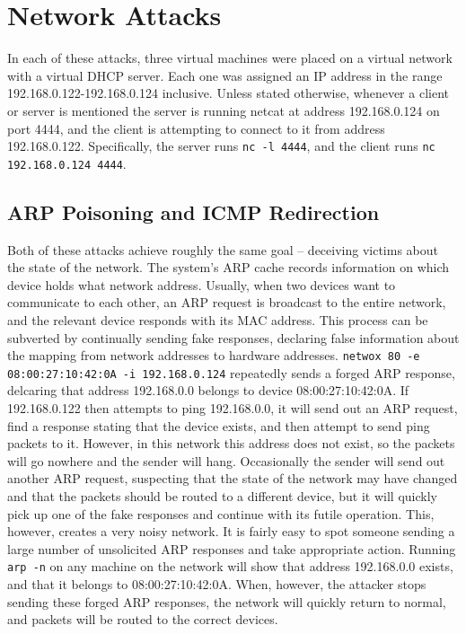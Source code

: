 \section{Network Attacks}

In each of these attacks, three virtual machines were placed on a virtual network with a virtual DHCP server. Each one
was assigned an IP address in the range 192.168.0.122-192.168.0.124 inclusive. Unless stated otherwise, whenever a
client or server is mentioned the server is running netcat at address 192.168.0.124 on port 4444, and the client is
attempting to connect to it from address 192.168.0.122. Specifically, the server runs {\tt nc -l 4444}, and the
client runs {\tt nc 192.168.0.124 4444}.

\subsection{ARP Poisoning and ICMP Redirection}

Both of these attacks achieve roughly the same goal -- deceiving victims about the state of the network. The system's
ARP cache records information on which device holds what network address. Usually, when two devices want to communicate
to each other, an ARP request is broadcast to the entire network, and the relevant device responds with its MAC address.
This process can be subverted by continually sending fake responses, declaring false information about the mapping from
network addresses to hardware addresses. {\tt netwox 80 -e 08:00:27:10:42:0A -i 192.168.0.124} repeatedly sends a forged
ARP response, delcaring that address 192.168.0.0 belongs to device 08:00:27:10:42:0A. If 192.168.0.122 then attempts to
ping 192.168.0.0, it will send out an ARP request, find a response stating that the device exists, and then attempt to
send ping packets to it. However, in this network this address does not exist, so the packets will go nowhere and the
sender will hang. Occasionally the sender will send out another ARP request, suspecting that the state of the network
may have changed and that the packets should be routed to a different device, but it will quickly pick up one of the
fake responses and continue with its futile operation. This, however, creates a very noisy network. It is fairly easy to
spot someone sending a large number of unsolicited ARP responses and take appropriate action. Running {\tt arp -n} on
any machine on the network will show that address 192.168.0.0 exists, and that it belongs to 08:00:27:10:42:0A. When,
however, the attacker stops sending these forged ARP responses, the network will quickly return to normal, and packets
will be routed to the correct devices.

